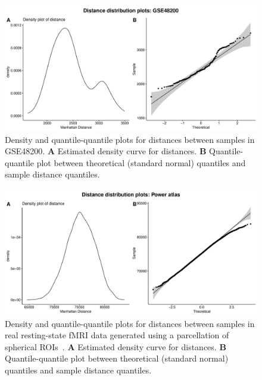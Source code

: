 \documentclass[10pt,letterpaper]{article}\usepackage[]{graphicx}\usepackage[]{color}
\begin{document}
\begin{figure}[H]
	\includegraphics[width=\textwidth]{manhattan-distance_hist_GSE48200.pdf}
	\caption{Density and quantile-quantile plots for distances between samples in GSE48200. \textbf{A} Estimated density curve for distances. \textbf{B} Quantile-quantile plot between theoretical (standard normal) quantiles and sample distance quantiles.}
\end{figure}

\begin{figure}[H]
	\includegraphics[width=\textwidth]{manhattan-distance_hist_power-atlas.pdf}
	\caption{Density and quantile-quantile plots for distances between samples in real resting-state fMRI data generated using a parcellation of spherical ROIs~\cite{power2011}. \textbf{A} Estimated density curve for distances. \textbf{B} Quantile-quantile plot between theoretical (standard normal) quantiles and sample distance quantiles.}
\end{figure}
\end{document}
